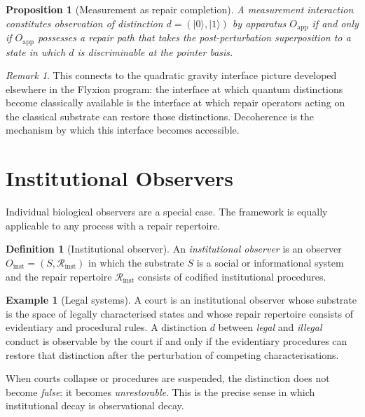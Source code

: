 \documentclass[12pt, oneside]{article}
\theoremstyle{plain}
\newtheorem{proposition}[theorem]{Proposition}
\theoremstyle{definition}
\newtheorem{definition}[theorem]{Definition}
\newtheorem{example}[theorem]{Example}
\theoremstyle{remark}
\newtheorem{remark}[theorem]{Remark}
\theoremstyle{definition}
\begin{document}
\begin{proposition}[Measurement as repair completion]
  A measurement interaction constitutes observation of distinction
  $d = (|0\rangle, |1\rangle)$ by apparatus $O_{\mathrm{app}}$ if and
  only if $O_{\mathrm{app}}$ possesses a repair path that takes the
  post-perturbation superposition to a state in which $d$ is
  discriminable at the pointer basis.
  \label{prop:measurement}
\end{proposition}

\begin{remark}
  This connects to the quadratic gravity interface picture developed
  elsewhere in the Flyxion program: the interface at which quantum
  distinctions become classically available is the interface at which
  repair operators acting on the classical substrate can restore those
  distinctions.
  Decoherence is the mechanism by which this interface becomes
  accessible.
\end{remark}


\section{Institutional Observers}
\label{sec:institutions}

Individual biological observers are a special case.
The framework is equally applicable to any process with a repair
repertoire.

\begin{definition}[Institutional observer]
  An \emph{institutional observer} is an observer
  $O_{\mathrm{inst}} = (S, \mathcal{R}_{\mathrm{inst}})$ in which the
  substrate $S$ is a social or informational system and the repair
  repertoire $\mathcal{R}_{\mathrm{inst}}$ consists of codified
  institutional procedures.
\end{definition}

\begin{example}[Legal systems]
  A court is an institutional observer whose substrate is the space of
  legally characterised states and whose repair repertoire consists of
  evidentiary and procedural rules.
  A distinction $d$ between \emph{legal} and \emph{illegal} conduct is
  observable by the court if and only if the evidentiary procedures
  can restore that distinction after the perturbation of competing
  characterisations.

  When courts collapse or procedures are suspended, the distinction
  does not become \emph{false}: it becomes \emph{unrestorable}.
  This is the precise sense in which institutional decay is
  observational decay.
\end{example}
\end{document}
